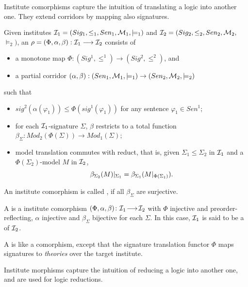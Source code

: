 \documentclass[10pt,%
\ifpretendfinal
final%
\else
draft%
\fi,
]{scrreprt}
\begin{document}
Institute comorphisms capture the intuition of translating a
logic into another one. They extend corridors by mapping also signatures.
\begin{definition}\label{def:sigroom-co}
Given institutes 
${\cal I}_1=(Sig_1,\leq_1,Sen_1,{\cal M}_1,\models_1)$ and
${\cal I}_2=(Sig_2,\leq_2,Sen_2,{\cal M}_2,$ ${\models_2)}$,
an   $\rho=(\Phi,\alpha,\beta):{\cal I}_1\longrightarrow 
{\cal I}_2$
 consists of
\begin{itemize}
  \item a monotone map $\Phi:(Sig^1,\leq^1)\to(Sig^2,\leq^2)$, and
  \item a partial corridor
  $(\alpha,\beta):{(Sen_1,{\cal M}_1,\models_1)}\to {(Sen_2,{\cal M}_2,\models_2)}$
\end{itemize}
such that
\begin{itemize}
  \item  $sig^2(\alpha(\varphi_1))\leq \Phi(sig^1(\varphi_1))$
  for any sentence $\varphi_1\in Sen^1$;
  \item for each ${\cal I}_1$-signature $\Sigma$, $\beta$ restricts to
a total function $\beta_\Sigma:Mod_2(\Phi(\Sigma))\to Mod_1(\Sigma)$;
 \item model translation commutes with reduct, that is,
given $\Sigma_1\leq\Sigma_2$ in ${\cal I}_1$ and a $\Phi(\Sigma_2)$-model
 $M$ in ${\cal I}_2$,
$$\beta_{\Sigma_2}(M)|_{\Sigma_1}=\beta_{\Sigma_1}(M|_{\Phi(\Sigma_1)}).$$
\end{itemize}
\end{definition}
An institute comorphism is called , if
all $\beta_\Sigma$ are surjective.

A  is a institute comorphism
$(\Phi,\alpha,\beta)\colon{\cal I}_1\!\longrightarrow\!{\cal I}_2$ with $\Phi$ injective and
preorder-reflecting, $\alpha$ injective and $\beta_\Sigma$ bijective
for each $\Sigma$. In this case, ${\cal I}_1$ is said to be a
 of ${\cal I}_2$.

A  is like a comorphism, except
that the signature translation functor $\Phi$ maps signatures to
\emph{theories} over the target institute.

Institute morphisms capture the intuition of reducing a logic into
another one, and are used for logic reductions.
\end{document}

